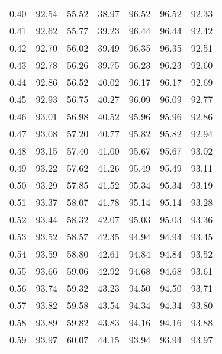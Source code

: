 \begin{tabular}{|c|c|c|c|c|c|c|}
      0.40 &     92.54 &     55.52 &      38.97 &   96.52 &      96.52 &         92.33 \\
      0.41 &     92.62 &     55.77 &      39.23 &   96.44 &      96.44 &         92.42 \\
      0.42 &     92.70 &     56.02 &      39.49 &   96.35 &      96.35 &         92.51 \\
      0.43 &     92.78 &     56.26 &      39.75 &   96.23 &      96.23 &         92.60 \\
      0.44 &     92.86 &     56.52 &      40.02 &   96.17 &      96.17 &         92.69 \\
      0.45 &     92.93 &     56.75 &      40.27 &   96.09 &      96.09 &         92.77 \\
      0.46 &     93.01 &     56.98 &      40.52 &   95.96 &      95.96 &         92.86 \\
      0.47 &     93.08 &     57.20 &      40.77 &   95.82 &      95.82 &         92.94 \\
      0.48 &     93.15 &     57.40 &      41.00 &   95.67 &      95.67 &         93.02 \\
      0.49 &     93.22 &     57.62 &      41.26 &   95.49 &      95.49 &         93.11 \\
      0.50 &     93.29 &     57.85 &      41.52 &   95.34 &      95.34 &         93.19 \\
      0.51 &     93.37 &     58.07 &      41.78 &   95.14 &      95.14 &         93.28 \\
      0.52 &     93.44 &     58.32 &      42.07 &   95.03 &      95.03 &         93.36 \\
      0.53 &     93.52 &     58.57 &      42.35 &   94.94 &      94.94 &         93.45 \\
      0.54 &     93.59 &     58.80 &      42.61 &   94.84 &      94.84 &         93.52 \\
      0.55 &     93.66 &     59.06 &      42.92 &   94.68 &      94.68 &         93.61 \\
      0.56 &     93.74 &     59.32 &      43.23 &   94.50 &      94.50 &         93.71 \\
      0.57 &     93.82 &     59.58 &      43.54 &   94.34 &      94.34 &         93.80 \\
      0.58 &     93.89 &     59.82 &      43.83 &   94.16 &      94.16 &         93.88 \\
      0.59 &     93.97 &     60.07 &      44.15 &   93.94 &      93.94 &         93.97 \\

\end{tabular}
